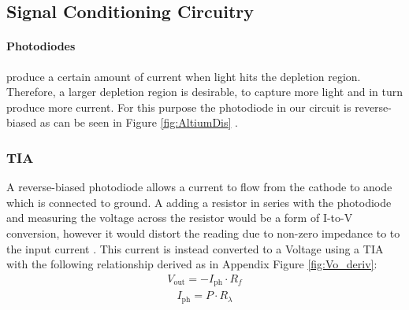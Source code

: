 \subsection{Signal Conditioning Circuitry} %
\label{subsec:SignalConditioningCircuitry}

\paragraph{Photodiodes} produce a certain amount of current when light hits the depletion region. Therefore, a larger depletion region is desirable, to capture more light and in turn produce more current. For this purpose the photodiode in our circuit is reverse-biased as can be seen in Figure \ref{fig:AltiumDis} \cite[p.155]{RefWorks:keiser2021fiber}. 

%
\subsubsection{\acf{TIA}}
A reverse-biased photodiode allows a current to flow from the cathode to anode which is connected to ground. A adding a resistor in series with the photodiode and measuring the voltage across the resistor would be a form of I-to-V conversion, however it would distort the reading due to non-zero impedance to to the input current \cite[p.233]{RefWorks:horowitz2015theart}. This current is instead converted to a Voltage using a \ac{TIA} with the following relationship derived as in Appendix Figure \ref{fig:Vo_deriv}:
\begin{equation} \label{eq:TIAoutput} %
  \begin{split}
  V_{\text{out}} = - I_{\text{ph}} \cdot R_f
  \end{split}
\end{equation}
\begin{equation} \label{eq:Photocurrent} %
  \begin{split}
  I_{\text{ph}} = P \cdot R_{\lambda}
  \end{split}
\end{equation}

